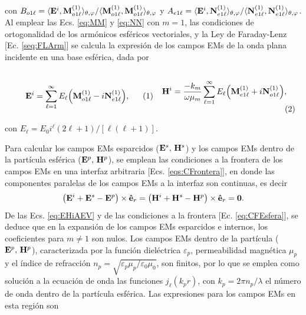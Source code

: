 con $B_{o1\ell} = \langle \vb{E}^i, \vb{M}_{o1\ell}^{(1)}  \rangle_{\theta,\varphi} / \langle \vb{M}_{o1\ell}^{(1)} ,\vb{M}_{o1\ell}^{(1)} \rangle_{\theta,\varphi}$ y $ A_{e1\ell} = \langle \vb{E}^i, \vb{N}_{e1\ell}^{(1)} \rangle_{\theta,\varphi} / \langle \vb{N}_{e1\ell}^{(1)},\vb{N}_{e1\ell}^{(1)} \rangle_{\theta,\varphi}$. Al emplear las Ecs. \eqref{eq:MM} y \eqref{eq:NN} con $m=1$, las condiciones de ortogonalidad de los armónicos esféricos vectoriales, y la Ley de Faraday-Lenz [Ec. \eqref{seq:FLArm}] se calcula la expresión de los campos EMs de la onda plana incidente en una base esférica, dada por 

	\begin{subequations}
	\eqhalf{	\vb{E}^i = \sum_{\ell =1}^\infty  E_\ell\qty(\vb{M}_{o1\ell}^{(1)}-i\vb{N}_{e1\ell}^{(1)}),\label{eqs:EiAEV}}
	\eqhalf{\vb{H}^i =\frac{-k_m}{\omega\mu_m} \sum_{\ell =1}^\infty  E_\ell\qty(\vb{M}_{e1\ell}^{(1)}+i\vb{N}_{o1\ell}^{(1)}),	\label{eqs:HiAEV}}
	\label{eq:EHiAEV}		
	\end{subequations}\vspace*{-1em}
	
\noindent con $E_\ell = E_0 i^\ell (2\ell+1)/[\ell(\ell+1)]$.

Para calcular los campos EMs esparcidos ($\vb{E}^s,\,\vb{H}^s$) y los campos EMs dentro de la partícula esférica ($\vb{E}^p,\,\vb{H}^p$), se emplean las condiciones a la frontera de los campos EMs en una interfaz arbitraria [Ecs. \eqref{eqs:CFrontera}], en donde las componentes paralelas de los campos EMs a la interfaz son continuas, es decir 
	\begin{align}
	\qty(\vb{E}^i+\vb{E}^s -\vb{E}^p)\times\vu{e}_r =
	\qty(\vb{H}^i+\vb{H}^s -\vb{H}^p)\times\vu{e}_r = \vb{0}.
	\label{eq:CFEsfera}
	\end{align}
De las Ecs. \eqref{eq:EHiAEV} y de las condiciones a la frontera [Ec. \eqref{eq:CFEsfera}], se deduce que en la expansión de los campos EMs esparcidos e  internos, los coeficientes para $m\neq 1$ son nulos. Los campos EMs dentro de la partícula ($\vb{E}^p,\,\vb{H}^p$), caracterizada por la función dieléctrica $\varepsilon_p$, permeabilidad magnética $\mu_p$ y el índice de refracción $n_p = \sqrt{\varepsilon_p\mu_p/\varepsilon_0\mu_0}$, son finitos, por lo que se emplea como solución a la ecuación de onda las funciones $j_\ell(k_p r)$, con $k_p = 2\pi n_p /\lambda$ el número de onda dentro de la partícula esférica. Las expresiones para los campos EMs  en esta región son  \vspace*{-1em}
	
